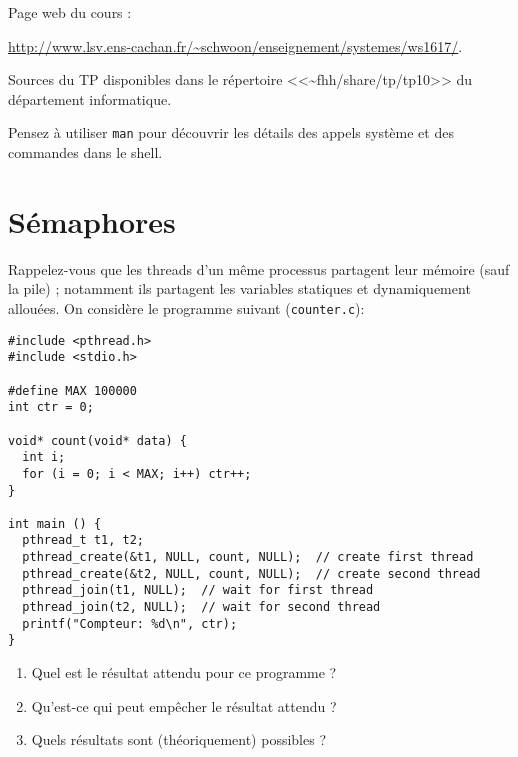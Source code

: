 \documentclass[11pt]{article}
\newcommand{\numtd}{10}
\newcommand{\titretd}{Les threads}
\begin{document}
\entete{\numtd}{\titretd}

Page web du cours :                                                                                                                                                                                                                                            
\begin{center}
\url{http://www.lsv.ens-cachan.fr/~schwoon/enseignement/systemes/ws1617/}.
\end{center}

Sources du TP disponibles dans le répertoire <<\textasciitilde{}fhh/share/tp/tp10>> du département informatique.

Pensez \`a utiliser \texttt{man} pour d\'ecouvrir les d\'etails
des appels syst\`eme et des commandes dans le shell.

\section{S\'emaphores}

Rappelez-vous que les threads d'un m\^eme processus partagent leur m\'emoire
(sauf la pile) ; notamment ils partagent les variables statiques et
dynamiquement allou\'ees. On consid\`ere le programme suivant 
(\texttt{counter.c}):

\begin{verbatim}
#include <pthread.h>
#include <stdio.h>

#define MAX 100000
int ctr = 0;

void* count(void* data) {
  int i;
  for (i = 0; i < MAX; i++) ctr++;
}

int main () {
  pthread_t t1, t2;
  pthread_create(&t1, NULL, count, NULL);  // create first thread
  pthread_create(&t2, NULL, count, NULL);  // create second thread
  pthread_join(t1, NULL);  // wait for first thread
  pthread_join(t2, NULL);  // wait for second thread
  printf("Compteur: %d\n", ctr);
}
\end{verbatim}

\begin{enumerate}
\item[(a)] Quel est le r\'esultat attendu pour ce programme ?
\item[(b)] Qu'est-ce qui peut emp\^echer le r\'esultat attendu ?
\item[(c)] Quels r\'esultats sont (th\'eoriquement) possibles ?
\end{enumerate}
\end{document}
